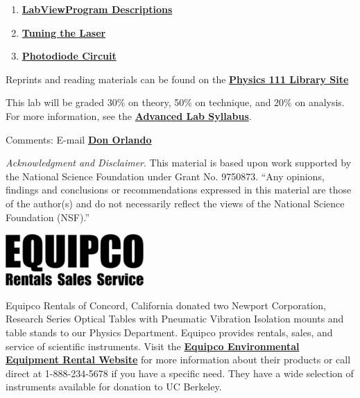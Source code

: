 \documentclass{../lab}
\begin{document}
\begin{enumerate}
    \item \href{http://experimentationlab.berkeley.edu/node/119}{\textbf{}}\href{http://experimentationlab.berkeley.edu/node/119}{\textbf{LabView}}\href{http://experimentationlab.berkeley.edu/node/119}{\textbf{Program Descriptions}}

    \item \href{http://experimentationlab.berkeley.edu/node/121#overlay-context=}{\textbf{Tuning the Laser}}
    
    \item \href{http://experimentationlab.berkeley.edu/node/120}{\textbf{Photodiode Circuit}}
\end{enumerate}

Reprints and reading materials can be found on the \href{http://physics111.lib.berkeley.edu/Physics111/Reprints/MNO/MNO\_index.html}{\textbf{Physics 111 Library Site}}

This lab will be graded 30\% on theory, 50\% on technique, and 20\% on analysis. For more information, see the \href{http://experimentationlab.berkeley.edu/syllabus}{\textbf{Advanced Lab Syllabus}}.

Comments: E-mail \href{\MailDonOrlando}{\textbf{Don Orlando}}

\emph{Acknowledgment and Disclaimer}. This material is based upon work supported by the National Science Foundation under Grant No. 9750873. ``Any opinions, findings and conclusions or recommendations expressed in this material are those of the author(s) and do not necessarily reflect the views of the National Science Foundation (NSF).''

\begin{center}
    \href{http://experimentationlab.berkeley.edu/sites/default/files/images/199px-Equipco_logo.png}{\includegraphics[width=0.5\linewidth]{images/199px-Equipco_logo.png}}
\end{center}

Equipco Rentals of Concord, California donated two Newport Corporation, Research Series Optical Tables with Pneumatic Vibration Isolation mounts and table stands to our Physics Department. Equipco provides rentals, sales, and service of scientific instruments. Visit the \href{http://www.equipcoservices.com/}{\textbf{Equipco Environmental Equipment Rental Website}} for more information about their products or call direct at 1-888-234-5678 if you have a specific need. They have a wide selection of instruments available for donation to UC Berkeley.
\end{document}
